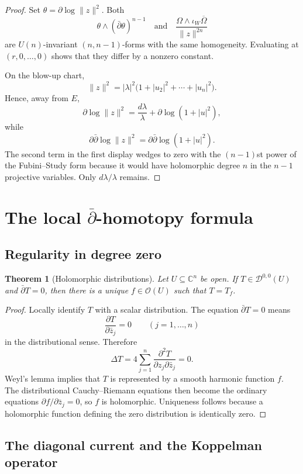 \documentclass[11pt,a4paper]{article}
\newtheorem{theorem}{Theorem}[section]
\theoremstyle{definition}
\theoremstyle{remark}
\newcommand{\C}{\mathbb C}
\newcommand{\Dcur}{\mathcal D}
\newcommand{\ddbar}{\bar\partial}
\newcommand{\Om}{\Omega}
\begin{document}
\begin{proof}
Set $\theta=\partial\log\|z\|^2$. Both
\[
\theta\wedge(\ddbar\theta)^{n-1}
\quad\text{and}\quad
\frac{\Om\wedge\iota_W\overline\Om}{\|z\|^{2n}}
\]
are $U(n)$-invariant $(n,n-1)$-forms with the same homogeneity. Evaluating at $(r,0,\dots,0)$ shows that they differ by a nonzero constant.

On the blow-up chart,
\[
\|z\|^2=|\lambda|^2\bigl(1+|u_2|^2+\cdots+|u_n|^2\bigr).
\]
Hence, away from $E$,
\[
\partial\log\|z\|^2
=\frac{d\lambda}{\lambda}+\partial\log(1+|u|^2),
\]
while
\[
\partial\ddbar\log\|z\|^2
=\partial\ddbar\log(1+|u|^2).
\]
The second term in the first display wedges to zero with the $(n-1)$st power of the Fubini--Study form because it would have holomorphic degree $n$ in the $n-1$ projective variables. Only $d\lambda/\lambda$ remains.
\end{proof}

\section{The local \texorpdfstring{$\bar\partial$}{dbar}-homotopy formula}

\subsection{Regularity in degree zero}

\begin{theorem}[Holomorphic distributions]
Let $U\subseteq\C^n$ be open. If $T\in\Dcur^{0,0}(U)$ and $\ddbar T=0$, then there is a unique $f\in\mathcal O(U)$ such that $T=T_f$.
\end{theorem}

\begin{proof}
Locally identify $T$ with a scalar distribution. The equation $\ddbar T=0$ means
\[
\frac{\partial T}{\partial\bar z_j}=0\qquad(j=1,\dots,n)
\]
in the distributional sense. Therefore
\[
\Delta T=4\sum_{j=1}^n
\frac{\partial^2T}{\partial z_j\partial\bar z_j}=0.
\]
Weyl's lemma implies that $T$ is represented by a smooth harmonic function $f$. The distributional Cauchy--Riemann equations then become the ordinary equations $\partial f/\partial\bar z_j=0$, so $f$ is holomorphic. Uniqueness follows because a holomorphic function defining the zero distribution is identically zero.
\end{proof}

\subsection{The diagonal current and the Koppelman operator}
\end{document}
